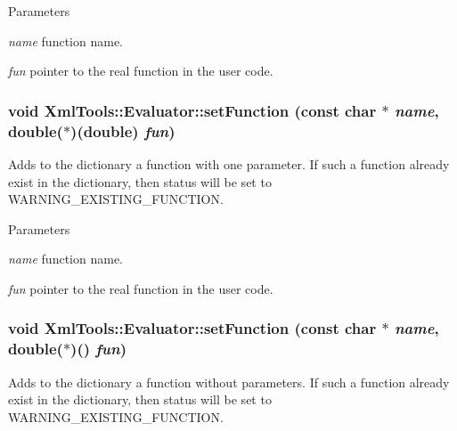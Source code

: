 \begin{DoxyParams}{Parameters}
\item[{\em name}]function name. \item[{\em fun}]pointer to the real function in the user code. \end{DoxyParams}
\hypertarget{class_xml_tools_1_1_evaluator_a2183927ba22512c28f9933439d88d6c7}{
\subsubsection[{setFunction}]{\setlength{\rightskip}{0pt plus 5cm}void XmlTools::Evaluator::setFunction (const char $\ast$ {\em name}, \/  double($\ast$)(double) {\em fun})}}
\label{class_xml_tools_1_1_evaluator_a2183927ba22512c28f9933439d88d6c7}
Adds to the dictionary a function with one parameter. If such a function already exist in the dictionary, then status will be set to WARNING\_\-EXISTING\_\-FUNCTION.


\begin{DoxyParams}{Parameters}
\item[{\em name}]function name. \item[{\em fun}]pointer to the real function in the user code. \end{DoxyParams}
\hypertarget{class_xml_tools_1_1_evaluator_a54a432d7beccf23e2bebda5e449fffe0}{
\subsubsection[{setFunction}]{\setlength{\rightskip}{0pt plus 5cm}void XmlTools::Evaluator::setFunction (const char $\ast$ {\em name}, \/  double($\ast$)() {\em fun})}}
\label{class_xml_tools_1_1_evaluator_a54a432d7beccf23e2bebda5e449fffe0}
Adds to the dictionary a function without parameters. If such a function already exist in the dictionary, then status will be set to WARNING\_\-EXISTING\_\-FUNCTION.


